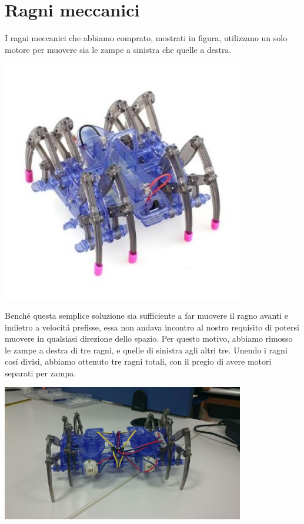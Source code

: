 \documentclass [11pt ,a4paper]{report}
\begin{document}
\section{Ragni meccanici}

I ragni meccanici che abbiamo comprato, mostrati in figura, utilizzano un solo motore per muovere sia le zampe a sinistra che quelle a destra. 
\begin{center}
\includegraphics[keepaspectratio, width=300pt]{Images/single_spider2.png}
\end{center}
Bench\'e questa semplice soluzione sia sufficiente a far muovere il ragno avanti e indietro a velocit\'a prefisse, essa non andava incontro al nostro requisito di potersi muovere in qualsiasi direzione dello spazio. Per questo motivo, abbiamo rimosso le zampe a destra di tre ragni, e quelle di sinistra agli altri tre. Unendo i ragni cos\'i divisi, abbiamo ottenuto tre ragni totali, con il pregio di avere motori separati per zampa.
\begin{center}
\includegraphics[keepaspectratio, width=300pt]{Images/double_spider.png}
\end{center}
\end{document}
